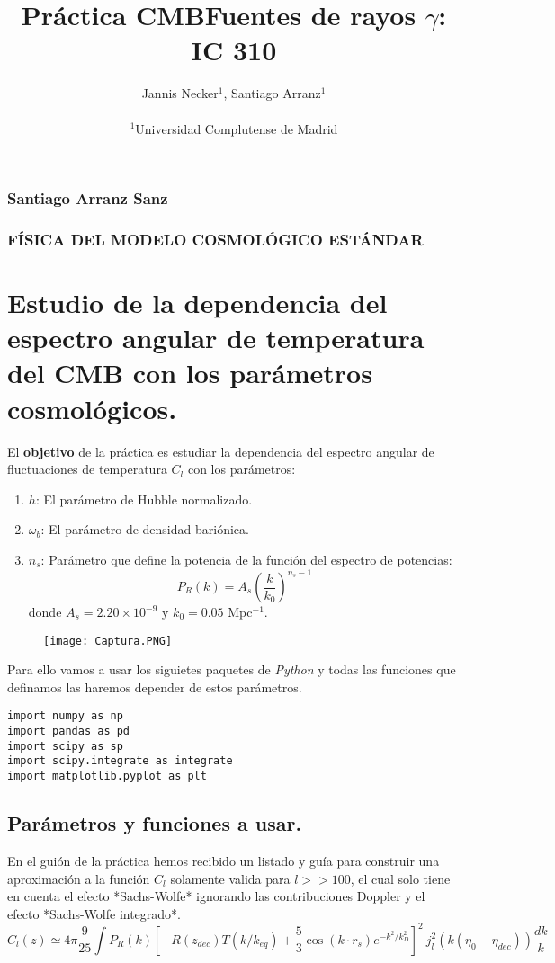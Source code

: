 \documentclass{article}
\title{Pr\'actica CMB}
\title{Fuentes de rayos $\gamma$: IC 310}
\author{Jannis Necker$^{1}$, Santiago Arranz$^{1}$ \\ \\
\small{$^{1}$Universidad Complutense de Madrid}}
\begin{document}
\subsubsection*{Santiago Arranz Sanz}
\subsubsection*{FÍSICA DEL MODELO COSMOLÓGICO ESTÁNDAR}

\section*{Estudio de la dependencia del espectro angular de temperatura del CMB con los parámetros cosmológicos.}

El \textbf{objetivo} de la práctica es estudiar la dependencia del espectro angular de fluctuaciones de temperatura $C_l$ con los parámetros:
\begin{enumerate}
\item \textbf{$h$}: El parámetro de Hubble normalizado.
\item \textbf{$\omega_b$}: El parámetro de densidad bariónica.
\item \textbf{$n_s$}: Parámetro que define la potencia de la función del espectro de potencias:
$$P_R(k)=A_s\left(\frac{k}{k_0}\right)^{n_s-1}$$
donde $A_s=2.20\times 10^{-9}$ y $k_0=0.05$ Mpc$^{-1}$.
\end{enumerate}

\begin{figure}[h]
\centering
\texttt{[image: Captura.PNG]}
\end{figure}

Para ello vamos a usar los siguietes paquetes de \textit{Python} y todas las funciones que definamos las haremos depender de estos parámetros.
\begin{lstlisting}[style=Python]
import numpy as np
import pandas as pd
import scipy as sp
import scipy.integrate as integrate
import matplotlib.pyplot as plt
\end{lstlisting}

\subsection*{Parámetros y funciones a usar.}
En el guión de la práctica hemos recibido un listado y guía para construir una aproximación a la función $C_l$ solamente valida para $l>>100$, el cual solo tiene en cuenta el efecto *Sachs-Wolfe* ignorando las contribuciones Doppler y el efecto *Sachs-Wolfe integrado*.
$$C_l(z)\simeq 4\pi\frac{9}{25}\int P_R(k)\left[-R(z_{dec})T(k/k_{eq})+\frac{5}{3}\cos(k\cdot r_s)e^{-k^2/k_D^2}\right]^2\ j_l^2(k(\eta_0-\eta_{dec}))\frac{dk}{k}$$
\end{document}
